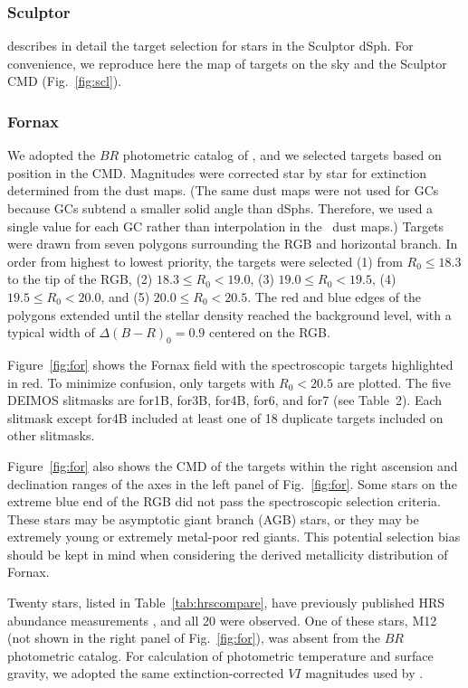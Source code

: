 \documentclass{emulateapj}
\begin{document}
\subsubsection{Sculptor}

\citeauthor*{kir09} describes in detail the target selection for stars
in the Sculptor dSph.  For convenience, we reproduce here the map of
targets on the sky and the Sculptor CMD (Fig.~\ref{fig:scl}).

\subsubsection{Fornax}
\label{sec:fornax}

We adopted the $BR$ photometric catalog of \citet{ste98}, and we
selected targets based on position in the CMD\@.  Magnitudes were
corrected star by star for extinction determined from the
\citet{sch98} dust maps.  (The same dust maps were not used for GCs
because GCs subtend a smaller solid angle than dSphs.  Therefore, we
used a single value for each GC rather than interpolation in the
\citeauthor{sch98}\ dust maps.)  Targets were drawn from seven
polygons surrounding the RGB and horizontal branch.  In order from
highest to lowest priority, the targets were selected (1) from $R_0
\le 18.3$ to the tip of the RGB, (2) $18.3 \le R_0 < 19.0$, (3) $19.0
\le R_0 < 19.5$, (4) $19.5 \le R_0 < 20.0$, and (5) $20.0 \le R_0 <
20.5$.  The red and blue edges of the polygons extended until the
stellar density reached the background level, with a typical width of
$\Delta(B-R)_0 = 0.9$ centered on the RGB.

Figure~\ref{fig:for} shows the Fornax field with the spectroscopic
targets highlighted in red.  To minimize confusion, only targets with
$R_0 < 20.5$ are plotted.  The five DEIMOS slitmasks are for1B, for3B,
for4B, for6, and for7 (see Table~2).  Each slitmask except for4B
included at least one of 18 duplicate targets included on other
slitmasks.

Figure~\ref{fig:for} also shows the CMD of the targets within the
right ascension and declination ranges of the axes in the left panel
of Fig.~\ref{fig:for}.  Some stars on the extreme blue end of the RGB
did not pass the spectroscopic selection criteria.  These stars may be
asymptotic giant branch (AGB) stars, or they may be extremely young or
extremely metal-poor red giants.  This potential selection bias should
be kept in mind when considering the derived metallicity distribution
of Fornax.

Twenty stars, listed in Table~\ref{tab:hrscompare}, have previously
published HRS abundance measurements \citep{she03,let10}, and all 20
were observed.  One of these stars, M12 (not shown in the right panel
of Fig.~\ref{fig:for}), was absent from the $BR$ photometric catalog.
For calculation of photometric temperature and surface gravity, we
adopted the same extinction-corrected $VI$ magnitudes used by
\citet{she03}.
\end{document}
